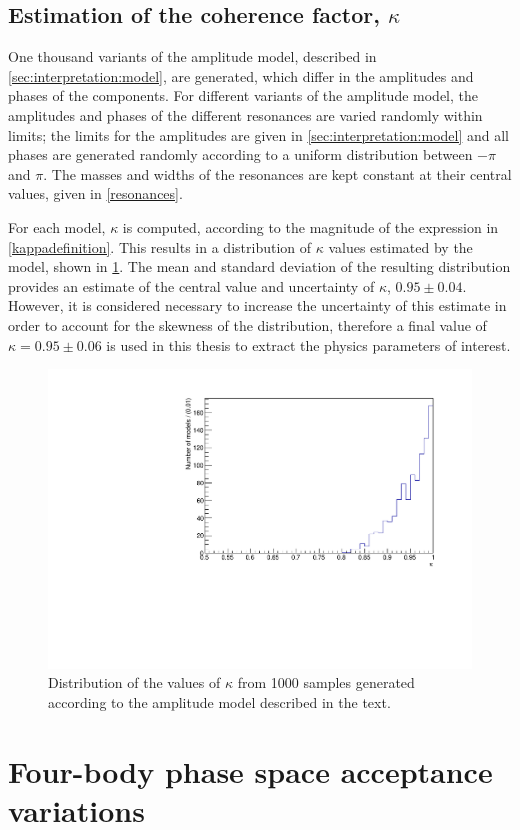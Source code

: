 \subsection{Estimation of the coherence factor, $\kappa$}
\label{sec:interpretation:kappa}

One thousand variants of the amplitude model, described in \sect\ref{sec:interpretation:model}, are generated, which differ in the amplitudes and phases of the components. For different variants of the amplitude model, the amplitudes and phases of the different resonances are varied randomly within limits; the limits for the amplitudes are given in \sect\ref{sec:interpretation:model} and all phases are generated randomly according to a uniform distribution between $-\pi$ and $\pi$. The masses and widths of the resonances are kept constant at their central values, given in \tab\ref{resonances}. 

For each model, $\kappa$ is computed, according to the magnitude of the expression in \eqn\ref{kappadefinition}. This results in a distribution of $\kappa$ values estimated by the model, shown in \fig\ref{kappadistribution}. The mean and standard deviation of the resulting distribution provides an estimate of the central value and uncertainty of $\kappa$,  $0.95 \pm 0.04$. However, it is considered necessary to increase the uncertainty of this estimate in order to account for the skewness of the distribution, therefore a final value of $\kappa = 0.95 \pm 0.06$ is used in this thesis to extract the physics parameters of interest.

\begin{figure}[h]
\centering
\includegraphics[trim = 0mm 0mm 0mm 8mm, clip, width=0.5\linewidth]{figures/results/kappa.pdf}
\caption{Distribution of the values of $\kappa$ from 1000 samples generated according to the amplitude model described in the text.}
\label{kappadistribution}
\end{figure}

\section{Four-body phase space acceptance variations}
\label{sec:interpretation:inputs}

